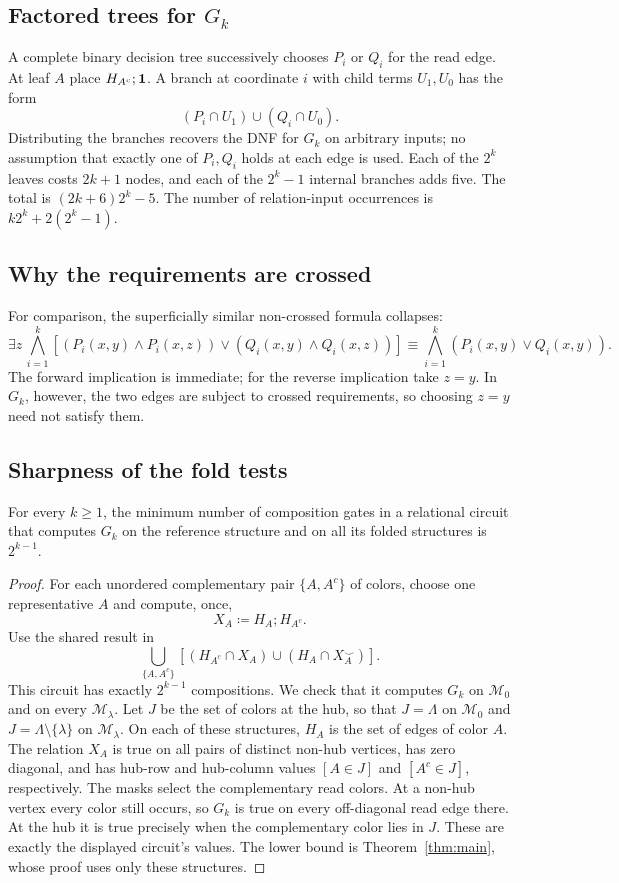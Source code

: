 \subsection{Factored trees for \texorpdfstring{$G_k$}{Gk}}\label{app:factored}
A complete binary decision tree successively chooses $P_i$ or $Q_i$ for
the read edge. At leaf $A$ place $H_{A^c};\mathbf{1}$. A branch at coordinate
$i$ with child terms $U_1,U_0$ has the form
\[
 (P_i\cap U_1)\cup(Q_i\cap U_0).
\]
Distributing the branches recovers the DNF for $G_k$ on arbitrary inputs;
no assumption that exactly one of $P_i,Q_i$ holds at each edge is used. Each of the $2^k$ leaves costs $2k+1$
nodes, and each of the $2^k-1$ internal branches adds five. The total is
$(2k+6)2^k-5$. The number of relation-input occurrences is
$k2^k+2(2^k-1)$.

\subsection{Why the requirements are crossed}
For comparison, the superficially similar non-crossed formula collapses:
\[
 \exists z\,\bigwedge_{i=1}^k
 [(P_i(x,y)\land P_i(x,z))\lor(Q_i(x,y)\land Q_i(x,z))]
 \equiv\bigwedge_{i=1}^k(P_i(x,y)\lor Q_i(x,y)).
\]
The forward implication is immediate; for the reverse implication take
$z=y$. In $G_k$, however, the two edges are subject to crossed
requirements, so choosing $z=y$ need not satisfy them.

\subsection{Sharpness of the fold tests}\label{app:promise}
\begin{proposition}\label{prop:promise}
For every $k\ge1$, the minimum number of composition gates in a
relational circuit that computes $G_k$ on the reference structure and on
all its folded structures is $2^{k-1}$.
\end{proposition}
\begin{proof}
For each unordered complementary pair $\{A,A^c\}$ of colors, choose one
representative $A$ and compute, once,
\[
 X_A\coloneqq H_A;H_{A^c}.
\]
Use the shared result in
\[
 \bigcup_{\{A,A^c\}}
 \left[(H_{A^c}\cap X_A)\cup(H_A\cap X_A^\smile)\right].
\]
This circuit has exactly $2^{k-1}$ compositions. We check that it
computes $G_k$ on $\mathcal M_0$ and on every $\mathcal M_\lambda$. Let
$J$ be the set of colors at the hub, so that $J=\Lambda$ on
$\mathcal M_0$ and $J=\Lambda\setminus\{\lambda\}$ on
$\mathcal M_\lambda$. On each of these structures, $H_A$ is the set of
edges of color $A$. The relation $X_A$ is true on all pairs of distinct
non-hub vertices, has zero diagonal, and has hub-row and hub-column
values $[A\in J]$ and $[A^c\in J]$, respectively. The masks select the
complementary read colors. At a non-hub vertex every color still occurs,
so $G_k$ is true on every off-diagonal read edge there. At the hub it is
true precisely when the complementary color lies in $J$. These are
exactly the displayed circuit's values. The lower bound is
Theorem~\ref{thm:main}, whose proof uses only these structures.
\end{proof}
